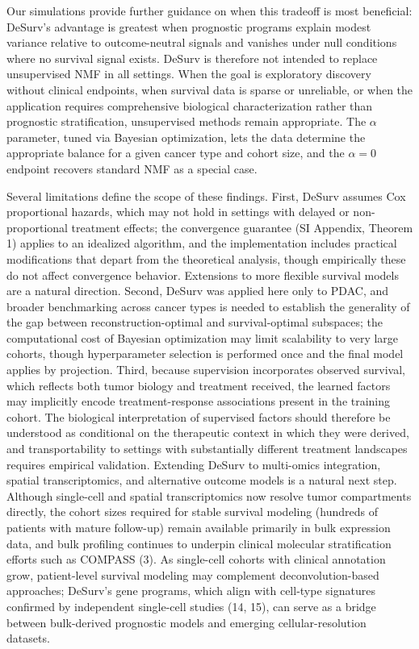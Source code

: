 \documentclass[9pt,twocolumn,twoside,]{pnas-new}
\begin{document}
Our simulations provide further guidance on when this tradeoff is most
beneficial: DeSurv's advantage is greatest when prognostic programs
explain modest variance relative to outcome-neutral signals and vanishes
under null conditions where no survival signal exists. DeSurv is
therefore not intended to replace unsupervised NMF in all settings. When
the goal is exploratory discovery without clinical endpoints, when
survival data is sparse or unreliable, or when the application requires
comprehensive biological characterization rather than prognostic
stratification, unsupervised methods remain appropriate. The \(\alpha\)
parameter, tuned via Bayesian optimization, lets the data determine the
appropriate balance for a given cancer type and cohort size, and the
\(\alpha = 0\) endpoint recovers standard NMF as a special case.

Several limitations define the scope of these findings. First, DeSurv
assumes Cox proportional hazards, which may not hold in settings with
delayed or non-proportional treatment effects; the convergence guarantee
(SI Appendix, Theorem 1) applies to an idealized algorithm, and the
implementation includes practical modifications that depart from the
theoretical analysis, though empirically these do not affect convergence
behavior. Extensions to more flexible survival models are a natural
direction. Second, DeSurv was applied here only to PDAC, and broader
benchmarking across cancer types is needed to establish the generality
of the gap between reconstruction-optimal and survival-optimal
subspaces; the computational cost of Bayesian optimization may limit
scalability to very large cohorts, though hyperparameter selection is
performed once and the final model applies by projection. Third, because
supervision incorporates observed survival, which reflects both tumor
biology and treatment received, the learned factors may implicitly
encode treatment-response associations present in the training cohort.
The biological interpretation of supervised factors should therefore be
understood as conditional on the therapeutic context in which they were
derived, and transportability to settings with substantially different
treatment landscapes requires empirical validation. Extending DeSurv to
multi-omics integration, spatial transcriptomics, and alternative
outcome models is a natural next step. Although single-cell and spatial
transcriptomics now resolve tumor compartments directly, the cohort
sizes required for stable survival modeling (hundreds of patients with
mature follow-up) remain available primarily in bulk expression data,
and bulk profiling continues to underpin clinical molecular
stratification efforts such as COMPASS (3). As single-cell cohorts with
clinical annotation grow, patient-level survival modeling may complement
deconvolution-based approaches; DeSurv's gene programs, which align with
cell-type signatures confirmed by independent single-cell studies (14,
15), can serve as a bridge between bulk-derived prognostic models and
emerging cellular-resolution datasets.
\end{document}
